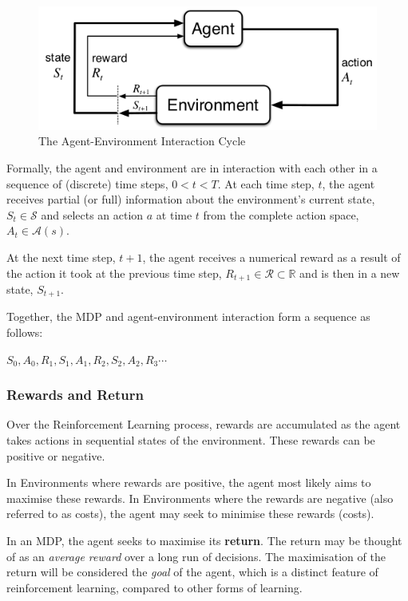 \documentclass{article}
\begin{document}
\begin{figure}
    \includegraphics[scale=0.6]{images/Agent_Env_Interaction.png}
    \caption{The Agent-Environment Interaction Cycle\cite{Sutton1998}}
    \label{fig:ag_env_interaction}
\end{figure}


Formally, the agent and environment are in interaction with each other in a sequence of (discrete) time steps, $ 0 < t < T$. At each time step, $t$, the agent receives partial (or full) information about the environment's current state, $ S_t \in \mathcal{S}$ and selects an action $a$ at time $t$ from the complete action space, $A_t \in \mathcal{A}(s)$. 

At the next time step, $t+1$, the agent receives a numerical reward as a result of the action it took at the previous time step, $R_{t+1} \in \mathcal{R} \subset \mathbb{R}$ and is then in a new state, $S_{t+1}$. 

Together, the MDP and agent-environment interaction form a sequence as follows: 

$S_0, A_0, R_1, S_1, A_1, R_2, S_2, A_2, R_3 \cdots $


\subsubsection{Rewards and Return}

Over the Reinforcement Learning process, rewards are accumulated as the agent takes actions in sequential states of the environment. These rewards can be positive or negative. 

In Environments where rewards are positive, the agent most likely aims to maximise these rewards. In Environments where the rewards are negative (also referred to as costs), the agent may seek to minimise these rewards (costs)\cite{RLNotes}.

In an MDP, the agent seeks to maximise its \textbf{return}. The return may be thought of as an \textit{average reward} over a long run of decisions. The maximisation of the return will be considered the \textit{goal} of the agent, which is a distinct feature of reinforcement learning, compared to other forms of learning.
\end{document}

